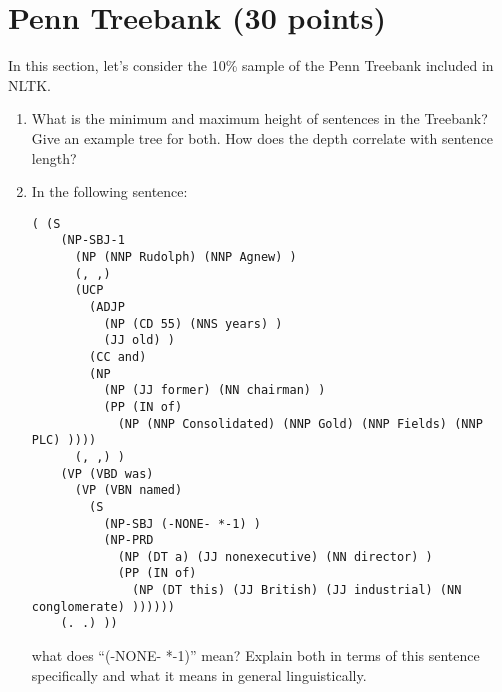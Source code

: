 \documentclass[11pt,twoside]{article}
\begin{document}
\section{Penn Treebank (30 points)}

In this section, let's consider the 10\% sample of the Penn Treebank included in NLTK.  

\begin{enumerate}
\item What is the minimum and maximum height of sentences in the Treebank?  Give an example tree for both.  How does the depth correlate with sentence length?
\item In the following sentence:
\begin{verbatim}
( (S 
    (NP-SBJ-1 
      (NP (NNP Rudolph) (NNP Agnew) )
      (, ,) 
      (UCP 
        (ADJP 
          (NP (CD 55) (NNS years) )
          (JJ old) )
        (CC and) 
        (NP 
          (NP (JJ former) (NN chairman) )
          (PP (IN of) 
            (NP (NNP Consolidated) (NNP Gold) (NNP Fields) (NNP PLC) ))))
      (, ,) )
    (VP (VBD was) 
      (VP (VBN named) 
        (S 
          (NP-SBJ (-NONE- *-1) )
          (NP-PRD 
            (NP (DT a) (JJ nonexecutive) (NN director) )
            (PP (IN of) 
              (NP (DT this) (JJ British) (JJ industrial) (NN conglomerate) ))))))
    (. .) ))
\end{verbatim}
what does ``(-NONE- *-1)'' mean?  Explain both in terms of this sentence specifically and what it means in general linguistically.


\end{enumerate}
\end{document}

